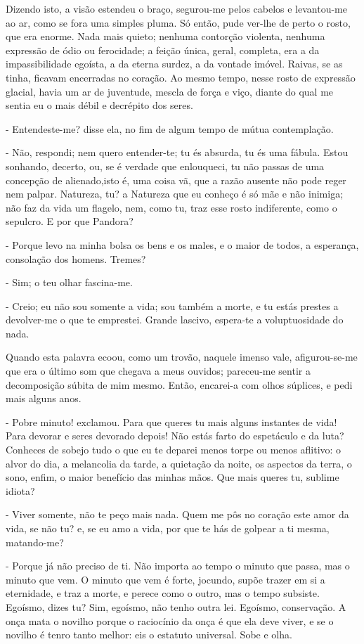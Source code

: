 \begin{corollary}
Dizendo isto, a visão estendeu o braço, segurou-me pelos cabelos e levantou-me ao ar, como se fora uma simples pluma. Só então, pude ver-lhe de perto o rosto, que era enorme. Nada mais quieto; nenhuma contorção violenta, nenhuma expressão de ódio ou ferocidade; a feição única, geral, completa, era a da impassibilidade egoísta, a da eterna surdez, a da vontade imóvel. Raivas, se as tinha, ficavam encerradas no coração. Ao mesmo tempo, nesse rosto de expressão glacial, havia um ar de juventude, mescla de força e viço, diante do qual me sentia eu o mais débil e decrépito dos seres.

- Entendeste-me? disse ela, no fim de algum tempo de mútua contemplação.

- Não, respondi; nem quero entender-te; tu és absurda, tu és uma fábula. Estou sonhando, decerto, ou, se é verdade que enlouqueci, tu não 
 passas de uma concepção de alienado,isto é, uma coisa vã, que a razão ausente não pode reger nem palpar. Natureza, tu? a Natureza que eu conheço é só mãe e não inimiga; não faz da vida um flagelo, nem, como tu, traz esse rosto indiferente, como o sepulcro. E por que Pandora?

- Porque levo na minha bolsa os bens e os males, e o maior de todos, a esperança, consolação dos homens. Tremes?

- Sim; o teu olhar fascina-me.

- Creio; eu não sou somente a vida; sou também a morte, e tu estás prestes a devolver-me o que te emprestei. Grande lascivo, espera-te a voluptuosidade do nada.

Quando esta palavra ecoou, como um trovão, naquele imenso vale, afigurou-se-me que era o último som que chegava a meus ouvidos; pareceu-me sentir a decomposição súbita de mim mesmo. Então, encarei-a com olhos súplices, e pedi mais alguns anos.

- Pobre minuto! exclamou. Para que queres tu mais alguns instantes de vida! Para devorar e seres devorado depois! Não estás farto do espetáculo e da luta? Conheces de sobejo tudo o que eu te deparei menos torpe ou menos aflitivo: o alvor do dia, a melancolia da tarde, a quietação da noite, os aspectos da terra, o sono, enfim, o maior benefício das minhas mãos. Que mais queres tu, sublime idiota?

- Viver somente, não te peço mais nada. Quem me pôs no coração este amor da vida, se não tu? e, se eu amo a vida, por que te hás de golpear a ti mesma, matando-me?

- Porque já não preciso de ti. Não importa ao tempo o minuto que passa, mas o minuto que vem. O minuto que vem é forte, jocundo, supõe trazer em si a eternidade, e traz a morte, e perece como o outro, mas o tempo subsiste. Egoísmo, dizes tu? Sim, egoísmo, não tenho outra lei. Egoísmo, conservação. A onça mata o novilho porque o raciocínio da onça é que ela deve viver, e se o novilho é tenro tanto melhor: eis o estatuto universal. Sobe e olha.


\end{corollary}
